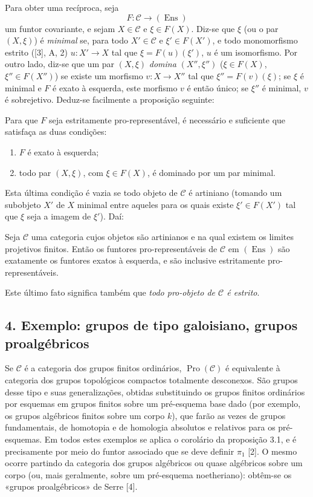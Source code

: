 Para obter uma recíproca, seja
\[
  F:\mathcal C\longrightarrow(\operatorname{Ens})
\]
um funtor covariante, e sejam $X\in\mathcal C$ e $\xi\in F(X)$. Diz-se que
$\xi$ (ou o par $(X,\xi)$) é \emph{minimal} se, para todo
$X'\in\mathcal C$ e $\xi'\in F(X')$, e todo monomorfismo estrito ([3], A, 2)
$u:X'\longrightarrow X$ tal que $\xi=F(u)(\xi')$, $u$ é um isomorfismo. Por
outro lado, diz-se que um par $(X,\xi)$ \emph{domina} $(X'',\xi'')$
($\xi\in F(X)$, $\xi''\in F(X'')$) se existe um morfismo
$v:X\longrightarrow X''$ tal que $\xi''=F(v)(\xi)$; se $\xi$ é minimal e $F$
é exato à esquerda, este morfismo $v$ é então único; se $\xi''$ é
minimal, $v$ é sobrejetivo. Deduz-se facilmente a proposição seguinte:

 Para que $F$ seja estritamente pro-representável, é
necessário e suficiente que satisfaça as duas condições:
\begin{enumerate}
\item[(i)] $F$ é exato à esquerda;
\item[(ii)] todo par $(X,\xi)$, com $\xi\in F(X)$, é dominado por um par
minimal.
\end{enumerate}

Esta última condição é vazia se todo objeto de $\mathcal C$ é artiniano
(tomando um subobjeto $X'$ de $X$ minimal entre aqueles para os quais existe
$\xi'\in F(X')$ tal que $\xi$ seja a imagem de $\xi'$). Daí:

 Seja $\mathcal C$ uma categoria cujos objetos são
artinianos e na qual existem os limites projetivos finitos. Então os
funtores pro-representáveis de $\mathcal C$ em $(\operatorname{Ens})$ são
exatamente os funtores exatos à esquerda, e são inclusive estritamente
pro-representáveis.

Este último fato significa também que \emph{todo pro-objeto de $\mathcal C$
é estrito}.

\subsection*{4. Exemplo: grupos de tipo galoisiano, grupos proalgébricos}

Se $\mathcal C$ é a categoria dos grupos finitos ordinários,
$\operatorname{Pro}(\mathcal C)$ é equivalente à categoria dos grupos
topológicos compactos totalmente desconexos. São grupos desse tipo e suas
generalizações, obtidas substituindo os grupos finitos ordinários por
esquemas em grupos finitos sobre um pré-esquema base dado (por exemplo, os
grupos algébricos finitos sobre um corpo $k$), que farão as vezes de
grupos fundamentais, de homotopia e de homologia absolutos e relativos para
os pré-esquemas. Em todos estes exemplos se aplica o corolário da
proposição 3.1, e é precisamente por meio do funtor associado que se deve
definir $\pi_1$ [2]. O mesmo ocorre partindo da categoria dos grupos
algébricos ou quase algébricos sobre um corpo (ou, mais geralmente, sobre um
pré-esquema noetheriano): obtêm-se os «grupos proalgébricos» de Serre [4].

